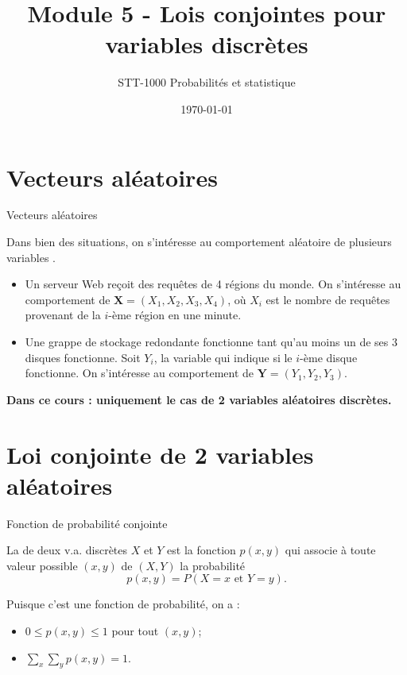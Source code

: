\documentclass{BeamerTemplate}
\title{Module 5 - Lois conjointes pour variables discrètes}
\subtitle{STT-1000 Probabilités et statistique}
\date{\today}
\begin{document}
\begin{frame}
\titlepage
\end{frame}

\section{Vecteurs aléatoires}

\begin{frame}[t]{Vecteurs aléatoires}

Dans bien des situations, on s'intéresse au comportement aléatoire de plusieurs variables .
\vspace{0.1in}

\begin{itemize}\itemsep4pt
 \item Un serveur Web reçoit des requêtes de 4 régions du monde. On s'intéresse au comportement
  de $\mathbf{X}=(X_1,X_2,X_3,X_4)$, où $X_i$ est le nombre de requêtes provenant
 de la $i$-ème région en une minute.
 \item Une grappe de stockage redondante fonctionne tant qu'au moins un de ses 3 disques fonctionne.
 Soit $Y_i$, la variable qui indique si le $i$-ème disque fonctionne. On s'intéresse au comportement
  de $\mathbf{Y}=(Y_1,Y_2,Y_3)$.
\end{itemize}

\vspace{0.1in}
\textbf{Dans ce cours : uniquement le cas de 2 variables aléatoires discrètes.}

\end{frame}

\section{Loi conjointe de 2 variables aléatoires}

\begin{frame}[t]{Fonction de probabilité conjointe}

 \begin{defn}{}
  La  de deux v.a. discrètes $X$ et $Y$ est la fonction
  $p(x,y)$ qui associe à toute valeur possible $(x,y)$ de $(X,Y)$ la probabilité
  $$p(x,y)=P(X=x\text{ et }Y=y).$$
 \end{defn}

 \vspace{0.1in}
 Puisque c'est une fonction de probabilité, on a :
 \begin{itemize}
 \item $0\leq p(x,y) \leq 1$ pour tout $(x,y)$;
 \item $\sum\limits_{x}\sum\limits_{y}p(x,y)=1$.
 \end{itemize}

\end{frame}
\end{document}
